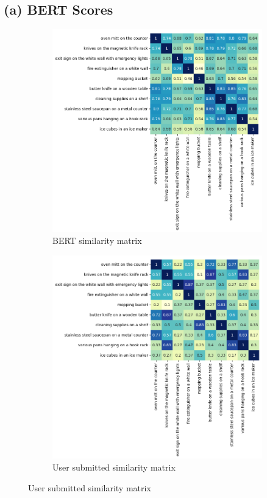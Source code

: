 \documentclass[]{article}
\begin{document}
\subsection{(a) BERT Scores}
\begin{figure}[h]
    \begin{subfigure}[b]{0.5\textwidth}
        \centering
        \includegraphics[width=\textwidth]{scores/bertscore.png}
        \caption{BERT similarity matrix}
    \end{subfigure}
    \begin{subfigure}[b]{0.5\textwidth}
        \centering
        \includegraphics[width=\textwidth]{scores/userscores.png}
        \caption{User submitted similarity matrix}
    \end{subfigure}
\end{figure}
\end{document}
